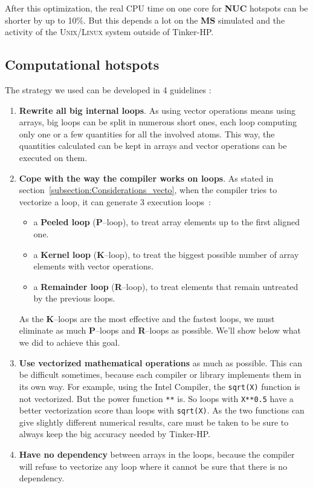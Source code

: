\documentclass[9pt,comparison]{livecoms}
\newcommand{\lv}{\Large\verb}
\begin{document}
After this optimization, the real CPU time on one core for \textbf{NUC} hotspots can be shorter by up to 10\%. But this depends a lot on the \textbf{MS} simulated and the activity of the \textsc{Unix/Linux} system outside of Tinker-HP.

\subsection{Computational hotspots}
\hspace{\parindent}The strategy we used can be developed in 4 guidelines : 
\begin{enumerate}
    \item \textbf{Rewrite all big internal loops}. As using vector operations means using arrays, big loops can be split in numerous short ones, each loop computing only one or a few quantities for all the involved atoms. This way, the quantities calculated can be kept in arrays and vector operations can be executed on them.
    \item \textbf{Cope with the way the compiler works on loops}. As stated in section~\ref{subsection:Considerations_vecto}, when the compiler tries to vectorize a loop, it can generate 3 execution loops~:
    \begin{itemize}
        \item a \textbf{Peeled loop} (\textbf{P}--loop), to treat array elements up to the first aligned one. 
        \item a \textbf{Kernel loop} (\textbf{K}--loop), to treat the biggest possible number of array elements with vector operations.
        \item a \textbf{Remainder loop} (\textbf{R}--loop), to treat elements that remain untreated by the previous loops.
    \end{itemize}
    As the \textbf{K}--loops are the most effective and the fastest loops, we must eliminate as much \textbf{P}--loops and \textbf{R}--loops as possible. We'll show below  what we did to achieve this goal.
    
    \item \textbf{Use vectorized mathematical operations} as much as possible. This can be difficult sometimes, because each compiler or library  implements them in its own way. For example, using the Intel Compiler, the {\color{blue}\lv|sqrt(X)|} function is not vectorized. But the power function {\color{blue}\lv|**|} is. So loops with {\color{blue}\lv|X**0.5|} have a better vectorization score than loops with {\color{blue}\lv|sqrt(X)|}. As the two functions can give slightly different numerical results, care must be taken to be sure to always keep the big accuracy needed by Tinker-HP.
    \item \textbf{Have no dependency} between arrays in the loops, because the compiler will refuse to vectorize any loop where it cannot be sure that there is no dependency.
\end{enumerate}
\end{document}
